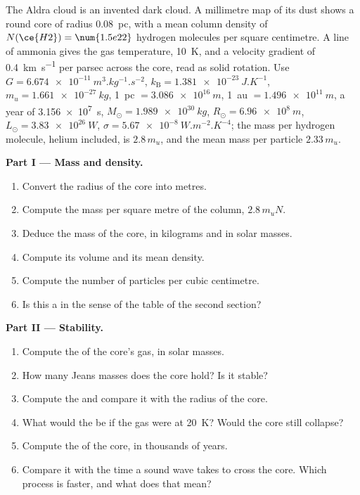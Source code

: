 \begin{problem}
\label{pb:b2:ism-star-formation:1}
The Aldra cloud is an invented dark cloud. A millimetre map of its dust
shows a round core of radius \qty{0.08}{pc}, with a mean column density of
$N(\ce{H2}) = \num{1.5e22}$ hydrogen molecules per square centimetre. A
line of ammonia gives the gas temperature, \qty{10}{K}, and a velocity
gradient of \qty{0.4}{km.s^{-1}} per parsec across the core, read as solid
rotation. Use $G = \qty{6.674e-11}{m^3.kg^{-1}.s^{-2}}$,
$k_{\mathrm B} = \qty{1.381e-23}{J.K^{-1}}$, $m_u = \qty{1.661e-27}{kg}$,
\qty{1}{pc} $= \qty{3.086e16}{m}$, \qty{1}{au} $= \qty{1.496e11}{m}$, a year of
\qty{3.156e7}{s}, $M_\odot = \qty{1.989e30}{kg}$, $R_\odot = \qty{6.96e8}{m}$,
$L_\odot = \qty{3.83e26}{W}$, $\sigma = \qty{5.67e-8}{W.m^{-2}.K^{-4}}$; the
mass per hydrogen molecule, helium included, is $2.8\,m_u$, and the mean mass
per particle $2.33\,m_u$.

\medskip
\noindent\textbf{Part I --- Mass and density.}
\begin{enumerate}
  \item Convert the radius of the core into metres.
  \item Compute the mass per square metre of the column, $2.8\,m_u N$.
  \item Deduce the mass of the core, in kilograms and in solar masses.
  \item Compute its volume and its mean density.
  \item Compute the number of particles per cubic centimetre.
  \item Is this a  in the sense of the table of the second section?
\end{enumerate}

\noindent\textbf{Part II --- Stability.}
\begin{enumerate}[resume]
  \item Compute the  of the core's gas, in solar masses.
  \item How many Jeans masses does the core hold? Is it stable?
  \item Compute the  and compare it with the radius of the core.
  \item What would the  be if the gas were at \qty{20}{K}? Would the
        core still collapse?
  \item Compute the  of the core, in thousands of years.
  \item Compare it with the time a sound wave takes to cross the core. Which
        process is faster, and what does that mean?
\end{enumerate}


\end{problem}
